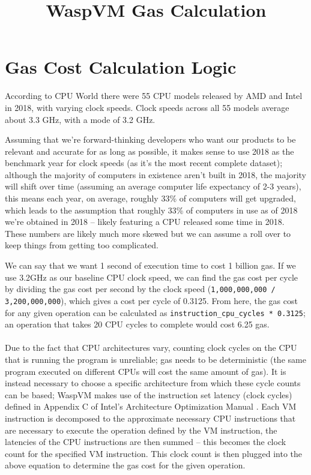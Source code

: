 \documentclass{article}
\title{WaspVM Gas Calculation}
\begin{document}
\maketitle

\section{Gas Cost Calculation
Logic}

According to CPU World \cite{CPU World} there were 55 CPU models released by AMD and Intel in 2018, with varying clock speeds. Clock speeds across all 55 models average about 3.3 GHz, with a mode of 3.2 GHz.

Assuming that we're forward-thinking developers who want our products to be relevant and accurate for as long as possible, it makes sense to use 2018 as the benchmark year for clock speeds (as it's the most recent complete dataset); although the majority of computers in existence aren't built in 2018, the majority will shift over time (assuming an average computer life expectancy of 2-3 years), this means each year, on average, roughly 33\% of computers will get upgraded, which leads to the assumption that roughly 33\% of computers in use as of 2018 we're obtained in 2018 -- likely featuring a CPU released some time in 2018. These numbers are likely much more skewed but we can assume a roll over to keep things from getting too complicated.

We can say that we want 1 second of execution time to cost 1 billion gas. If we use 3.2GHz as our baseline CPU clock speed, we can find the gas cost per cycle by dividing the gas cost per second by the clock speed (\texttt{1,000,000,000 / 3,200,000,000}), which gives a cost per cycle of 0.3125. From here, the gas cost for any given operation can be calculated as \texttt{instruction\_cpu\_cycles\ *\ 0.3125}; an operation that takes 20 CPU cycles to complete would cost 6.25 gas.
\\\\

Due to the fact that CPU architectures vary, counting clock cycles on the CPU that is running the program is unreliable; gas needs to be deterministic (the same program executed on different CPUs will cost the same amount of gas). It is instead necessary to choose a specific architecture from which these cycle counts can be based; WaspVM makes use of the instruction set latency (clock cycles) defined in Appendix C of Intel's Architecture Optimization Manual \cite{Intel Manual}. Each VM instruction is decomposed to the approximate necessary CPU instructions that are necessary to execute the operation defined by the VM instruction, the latencies of the CPU instructions are then summed -- this becomes the clock count for the specified VM instruction. This clock count is then plugged into the above equation to determine the gas cost for the given operation.
\end{document}
